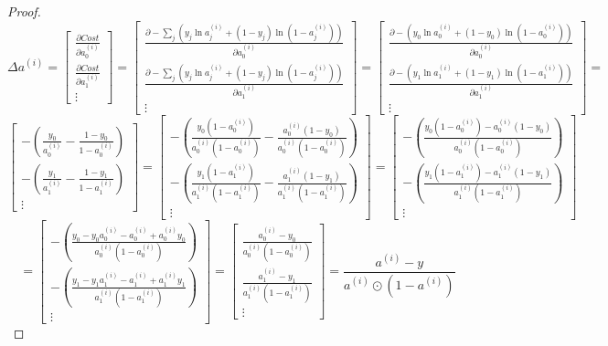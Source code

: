 \documentclass{article}
\theoremstyle{definition}
\theoremstyle{remark}
\theoremstyle{example}
\newcommand{\pare}[1]{\left(#1\right)}
\begin{document}
\begin{proof}
$$
\Delta a^{(i)} =
\begin{bmatrix}
    \frac{\partial Cost}{\partial a^{(i)}_0}\\
    \frac{\partial Cost}{\partial a^{(i)}_1}\\
    \vdots
\end{bmatrix}
=
\begin{bmatrix}
    \frac{\partial -\sum_j (y_j \ln a^{(i)}_j + (1 - y_j) \ln (1 - a^{(i)}_j))}{\partial a^{(i)}_0}\\
    \frac{\partial -\sum_j (y_j \ln a^{(i)}_j + (1 - y_j) \ln (1 - a^{(i)}_j))}{\partial a^{(i)}_1}\\
    \vdots
\end{bmatrix}
=
\begin{bmatrix}
    \frac{\partial -(y_0 \ln a^{(i)}_0 + (1 - y_0) \ln (1 - a^{(i)}_0))}{\partial a^{(i)}_0}\\
    \frac{\partial -(y_1 \ln a^{(i)}_1 + (1 - y_1) \ln (1 - a^{(i)}_1))}{\partial a^{(i)}_1}\\
    \vdots
\end{bmatrix}
=$$
$$\begin{bmatrix}
    -\pare{\frac{y_0}{a^{(i)}_0} - \frac{1 - y_0}{1 - a^{(i)}_0}}\\
    -\pare{\frac{y_1}{a^{(i)}_1} - \frac{1 - y_1}{1 - a^{(i)}_1}}\\
    \vdots
\end{bmatrix}
=
\begin{bmatrix}
    -\pare{\frac{y_0(1 - a^{(i)}_0)}{a^{(i)}_0(1 - a^{(i)}_0)} - \frac{a^{(i)}_0(1 - y_0)}{a^{(i)}_0(1 - a^{(i)}_0)}}\\
    -\pare{\frac{y_1(1 - a^{(i)}_1)}{a^{(i)}_1(1 - a^{(i)}_1)} - \frac{a^{(i)}_1(1 - y_1)}{a^{(i)}_1(1 - a^{(i)}_1)}}\\
    \vdots
\end{bmatrix}
=
\begin{bmatrix}
    -\pare{\frac{y_0(1 - a^{(i)}_0) - a^{(i)}_0(1 - y_0)}{a^{(i)}_0(1 - a^{(i)}_0)}}\\
    -\pare{\frac{y_1(1 - a^{(i)}_1) - a^{(i)}_1(1 - y_1)}{a^{(i)}_1(1 - a^{(i)}_1)}}\\
    \vdots
\end{bmatrix}$$
$$=
\begin{bmatrix}
    -\pare{\frac{y_0 - y_0 a^{(i)}_0 - a^{(i)}_0 + a^{(i)}_0 y_0}{a^{(i)}_0(1 - a^{(i)}_0)}}\\
    -\pare{\frac{y_1 - y_1 a^{(i)}_1 - a^{(i)}_1 + a^{(i)}_1 y_1}{a^{(i)}_1(1 - a^{(i)}_1)}}\\
    \vdots
\end{bmatrix}
=
\begin{bmatrix}
    \frac{a^{(i)}_0 - y_0}{a^{(i)}_0(1 - a^{(i)}_0)}\\
    \frac{a^{(i)}_1 - y_1}{a^{(i)}_1(1 - a^{(i)}_1)}\\
    \vdots
\end{bmatrix}
= \frac{a^{(i)} - y}{a^{(i)} \odot (1 - a^{(i)})}
$$
\end{proof}
\end{document}
